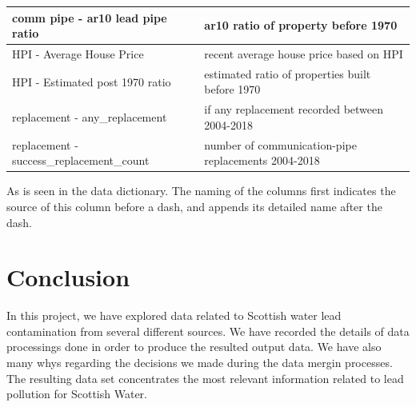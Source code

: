 \documentclass[11pt,twoside]{article}
\numberwithin{Theorem}{section}
\numberwithin{Definition}{section}
\numberwithin{Lemma}{section}
\numberwithin{Algorithm}{section}
\numberwithin{equation}{section}
\begin{document}
\begin{center}
\begin{tabular}{ll}
        \hline
        comm pipe - ar10 lead pipe ratio             &
        ar10 ratio of property before 1970\\
        \hline
        HPI - Average House Price                  &
        recent average house price based on HPI\\
        \hline
        HPI - Estimated post 1970 ratio            &
        estimated ratio of properties built before 1970\\
        \hline
        replacement - any\_replacement              &
        if any replacement recorded between 2004-2018\\
        \hline
        replacement - success\_replacement\_count    &
        number of communication-pipe replacements 2004-2018\\
        \hline
    \end{tabular}
\end{center}
As is seen in the data dictionary. The naming of the columns first indicates the source of this column before a dash, and appends its detailed name after the dash.

\section{Conclusion}
In this project, we have explored data related to Scottish water lead contamination from several different sources. We have recorded the details of data processings done in order to produce the resulted output data. We have also many whys regarding the decisions we made during the data mergin processes. The resulting data set concentrates the most relevant information related to lead pollution for Scottish Water.

\clearpage



\clearpage
\end{document}
